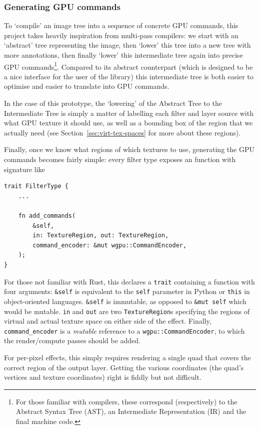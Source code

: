 \documentclass[12pt]{article}
\begin{document}
\subsubsection{Generating GPU commands}\label{sec:gpu-cmds}

To `compile' an image tree into a sequence of concrete GPU commands, this project takes heavily
inspiration from multi-pass compilers: we start with an `abstract' tree representing the image, then
`lower' this tree into a new tree with more annotations, then finally `lower' this intermediate tree
again into precise GPU commands\footnote{For those familiar with compilers, these correspond
(respectively) to the Abstract Syntax Tree (AST), an Intermediate Representation (IR) and the final
machine code.}.  Compared to its abstract counterpart (which is designed to be a nice interface for
the user of the library) this intermediate tree is both easier to optimise and easier to translate
into GPU commands.

In the case of this prototype, the `lowering' of the Abstract Tree to the Intermediate Tree is
simply a matter of labelling each filter and layer source with what GPU texture it should use, as
well as a bounding box of the region that we actually need (see Section~\ref{sec:virt-tex-spaces}
for more about these regions).

Finally, once we know what regions of which textures to use, generating the GPU commands becomes
fairly simple: every filter type exposes an function with signature like

\begin{verbatim}
trait FilterType {
    ...

    fn add_commands(
        &self,
        in: TextureRegion, out: TextureRegion,
        command_encoder: &mut wgpu::CommandEncoder,
    );
}
\end{verbatim}

For those not familiar with Rust, this declares a \verb|trait| containing a function with four
arguments: \verb|&self| is equivalent to the \verb|self| parameter in Python or \verb|this| in
object-oriented languages.  \verb|&self| is immutable, as opposed to \verb|&mut self| which would be
mutable.  \verb|in| and \verb|out| are two \verb|TextureRegion|s specifying the regions of virtual
and actual texture space on either side of the effect.  Finally, \verb|command_encoder| is a
\emph{mutable} reference to a \verb|wgpu::CommandEncoder|, to which the render/compute passes should
be added.

For per-pixel effects, this simply requires rendering a single quad that covers the correct region
of the output layer.  Getting the various coordinates (the quad's vertices and texture coordinates)
right is fiddly but not difficult.
\end{document}
